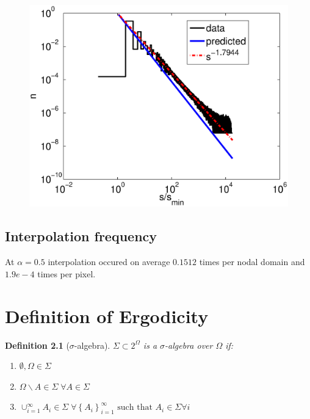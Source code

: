 \documentclass{report}
\begin{document}
\begin{figure}
  \begin{center}
    \includegraphics[width=\textwidth]{figs/results/perc_100_to_2000_sizes.eps}
  \end{center}
\end{figure}


\section{Interpolation frequency}
At $\alpha = 0.5$ interpolation occured on average $0.1512$ times per nodal domain and $1.9e-4$ times per pixel.



\appendix
\chapter{Definition of Ergodicity}
\label{sec:ergodicity}

\newtheorem{dfn}{Definition}
\begin{dfn}[$\sigma$-algebra]
$\Sigma \subset 2^{\Omega}$ is a \emph{$\sigma$-algebra} over $\Omega$ if:
\begin{enumerate}
\item
$\emptyset, \Omega \in \Sigma$
\item
$\Omega \backslash A \in \Sigma \; \forall A \in \Sigma$
\item
$\cup_{i=1}^{\infty}A_{i} \in \Sigma \; \forall \left\{A_{i}\right\}_{i=1}^{\infty}\text{ such that }A_{i} \in \Sigma \forall i$
\end{enumerate}
\end{dfn}
\end{document}
